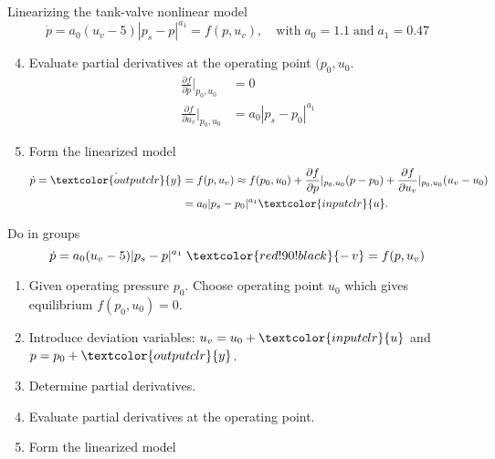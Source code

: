 \documentclass[presentation,aspectratio=169]{beamer}
\begin{document}
\begin{frame}[label={sec:orgadabd43}]{Linearizing the tank-valve nonlinear model}
\[ \dot{p} = a_0(u_v - 5)|p_s - p|^{a_1} = f(p, u_v), \quad \text{with} \; a_0=1.1\; \text{and}\; a_1 = 0.47\]
\begin{enumerate}
\setcounter{enumi}{3}
\item Evaluate partial derivatives at the operating point \((p_0, u_0\).
\begin{align*}
\frac{\partial f}{\partial p}\big|_{p_0, u_0} &= 0\\
\frac{\partial f}{\partial u_v}\big|_{p_0, u_0} &=  a_0|p_s - p_0|^{a_1}
\end{align*}
\item Form the linearized model
\begin{equation}
\begin{aligned} \dot{p} = \dot{\textcolor{outputclr}{y}} &= f(p, u_v) \approx f(p_0, u_0) + \frac{\partial f}{\partial p}|_{p_0, u_0}(p-p_0) + \frac{\partial f}{\partial u_v}|_{p_0, u_0}(u_v - u_0)\\
 &=  a_0|p_s - p_0|^{a_1} \textcolor{inputclr}{u}.
\end{aligned}
\end{equation}
\end{enumerate}
\end{frame}




\begin{frame}[label={sec:orgdf6bf5d}]{Do in groups}
\[ \dot{p} = a_0(u_v - 5)|p_s - p|^{a_1}\; \textcolor{red!90!black}{-\, v} = f(p, u_v)\]

\begin{enumerate}
\item Given operating pressure \(p_0\). Choose operating point \(u_0\) which gives equilibrium \(f(p_0, u_0) = 0\).
\item Introduce deviation variables: \(u_v = u_0 + \textcolor{inputclr}{u}\) and \(p = p_0 + \textcolor{outputclr}{y}\).
\item Determine partial derivatives.
\item Evaluate partial derivatives at the operating point.
\item Form the linearized model
\end{enumerate}
\end{frame}
\end{document}
